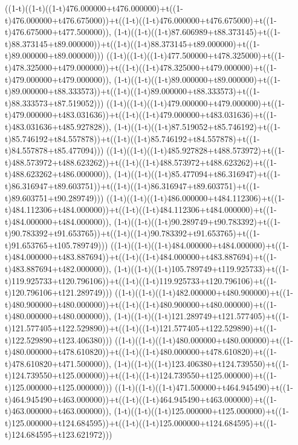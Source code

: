 ((1-t)((1-t)((1-t)476.000000+t476.000000)+t((1-t)476.000000+t476.675000))+t((1-t)((1-t)476.000000+t476.675000)+t((1-t)476.675000+t477.500000)),                                     (1-t)((1-t)((1-t)87.606989+t88.373145)+t((1-t)88.373145+t89.000000))+t((1-t)((1-t)88.373145+t89.000000)+t((1-t)89.000000+t89.000000)))
((1-t)((1-t)((1-t)477.500000+t478.325000)+t((1-t)478.325000+t479.000000))+t((1-t)((1-t)478.325000+t479.000000)+t((1-t)479.000000+t479.000000)),                                     (1-t)((1-t)((1-t)89.000000+t89.000000)+t((1-t)89.000000+t88.333573))+t((1-t)((1-t)89.000000+t88.333573)+t((1-t)88.333573+t87.519052)))
((1-t)((1-t)((1-t)479.000000+t479.000000)+t((1-t)479.000000+t483.031636))+t((1-t)((1-t)479.000000+t483.031636)+t((1-t)483.031636+t485.927828)),                                     (1-t)((1-t)((1-t)87.519052+t85.746192)+t((1-t)85.746192+t84.557878))+t((1-t)((1-t)85.746192+t84.557878)+t((1-t)84.557878+t85.477094)))
((1-t)((1-t)((1-t)485.927828+t488.573972)+t((1-t)488.573972+t488.623262))+t((1-t)((1-t)488.573972+t488.623262)+t((1-t)488.623262+t486.000000)),                                     (1-t)((1-t)((1-t)85.477094+t86.316947)+t((1-t)86.316947+t89.603751))+t((1-t)((1-t)86.316947+t89.603751)+t((1-t)89.603751+t90.289749)))
((1-t)((1-t)((1-t)486.000000+t484.112306)+t((1-t)484.112306+t484.000000))+t((1-t)((1-t)484.112306+t484.000000)+t((1-t)484.000000+t484.000000)),                                     (1-t)((1-t)((1-t)90.289749+t90.783392)+t((1-t)90.783392+t91.653765))+t((1-t)((1-t)90.783392+t91.653765)+t((1-t)91.653765+t105.789749)))
((1-t)((1-t)((1-t)484.000000+t484.000000)+t((1-t)484.000000+t483.887694))+t((1-t)((1-t)484.000000+t483.887694)+t((1-t)483.887694+t482.000000)),                                     (1-t)((1-t)((1-t)105.789749+t119.925733)+t((1-t)119.925733+t120.796106))+t((1-t)((1-t)119.925733+t120.796106)+t((1-t)120.796106+t121.289749)))
((1-t)((1-t)((1-t)482.000000+t480.900000)+t((1-t)480.900000+t480.000000))+t((1-t)((1-t)480.900000+t480.000000)+t((1-t)480.000000+t480.000000)),                                     (1-t)((1-t)((1-t)121.289749+t121.577405)+t((1-t)121.577405+t122.529890))+t((1-t)((1-t)121.577405+t122.529890)+t((1-t)122.529890+t123.406380)))
((1-t)((1-t)((1-t)480.000000+t480.000000)+t((1-t)480.000000+t478.610820))+t((1-t)((1-t)480.000000+t478.610820)+t((1-t)478.610820+t471.500000)),                                     (1-t)((1-t)((1-t)123.406380+t124.739550)+t((1-t)124.739550+t125.000000))+t((1-t)((1-t)124.739550+t125.000000)+t((1-t)125.000000+t125.000000)))
((1-t)((1-t)((1-t)471.500000+t464.945490)+t((1-t)464.945490+t463.000000))+t((1-t)((1-t)464.945490+t463.000000)+t((1-t)463.000000+t463.000000)),                                     (1-t)((1-t)((1-t)125.000000+t125.000000)+t((1-t)125.000000+t124.684595))+t((1-t)((1-t)125.000000+t124.684595)+t((1-t)124.684595+t123.621972)))
